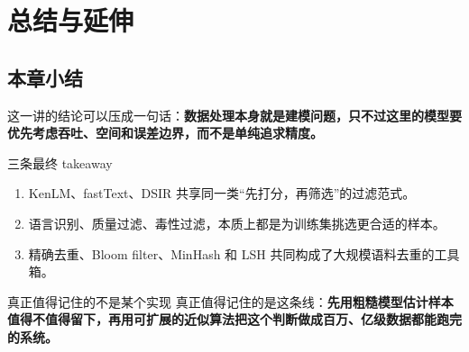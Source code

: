 \section{总结与延伸}

\subsection{本章小结}

这一讲的结论可以压成一句话：\textbf{数据处理本身就是建模问题，只不过这里的模型要优先考虑吞吐、空间和误差边界，而不是单纯追求精度。}

\begin{importantbox}{三条最终 takeaway}
\begin{enumerate}
    \item KenLM、fastText、DSIR 共享同一类“先打分，再筛选”的过滤范式。
    \item 语言识别、质量过滤、毒性过滤，本质上都是为训练集挑选更合适的样本。
    \item 精确去重、Bloom filter、MinHash 和 LSH 共同构成了大规模语料去重的工具箱。
\end{enumerate}
\end{importantbox}

\begin{knowledgebox}{真正值得记住的不是某个实现}
真正值得记住的是这条线：\textbf{先用粗糙模型估计样本值得不值得留下，再用可扩展的近似算法把这个判断做成百万、亿级数据都能跑完的系统。}
\end{knowledgebox}


